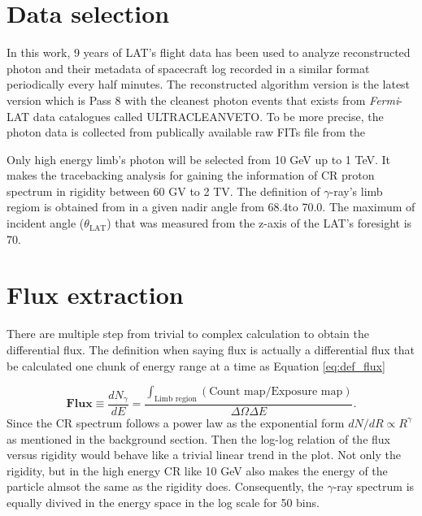 \section{Data selection}
In this work, 9 years of LAT's flight data has been used
to analyze reconstructed photon and their metadata of spacecraft
log recorded in a similar format periodically every half minutes.
The reconstructed algorithm version is the latest version which is
Pass 8 with the cleanest photon events that exists from \textit{Fermi}-LAT
data catalogues called ULTRACLEANVETO. To be more precise, the photon 
data is collected from publically available raw FITs file from the 

Only high energy limb's photon will be selected from 10 GeV up to 1 TeV.
It makes the tracebacking analysis for gaining the information of
CR proton spectrum in rigidity between 60 GV to 2 TV. The definition 
of $\gamma$-ray's limb regiom is obtained from \cite{FermiEarth09} in 
a given nadir angle from 68.4\textdegree to 70.0\textdegree. 
The maximum of incident angle ($\theta_\text{LAT}$) that was
measured from the z-axis of the LAT's foresight is 70\textdegree.


\section{Flux extraction}

There are multiple step from trivial to complex calculation to 
obtain the differential flux. The definition when saying flux 
is actually a differential flux that be calculated one
chunk of energy range at a time as Equation \ref{eq:def_flux}

\begin{equation}
    \textbf{Flux} \equiv \frac{dN_\gamma}{dE} = \frac{\int_\text{Limb region}(\text{Count map}/\text{Exposure map})}{\Delta\Omega\Delta E}.
    \label{eq:def_flux}
\end{equation}
Since the CR spectrum follows a power law as the exponential form 
 $dN/dR \propto R^\gamma$ as mentioned in the background section.
Then the log-log relation of the flux versus rigidity would behave 
like a trivial linear trend in the plot. Not only the rigidity, but 
in the high energy CR like 10 GeV also makes the energy of the particle
almsot the same as the rigidity does. Consequently, the $\gamma$-ray
spectrum is equally divived in the energy space in the log scale for 
50 bins.

